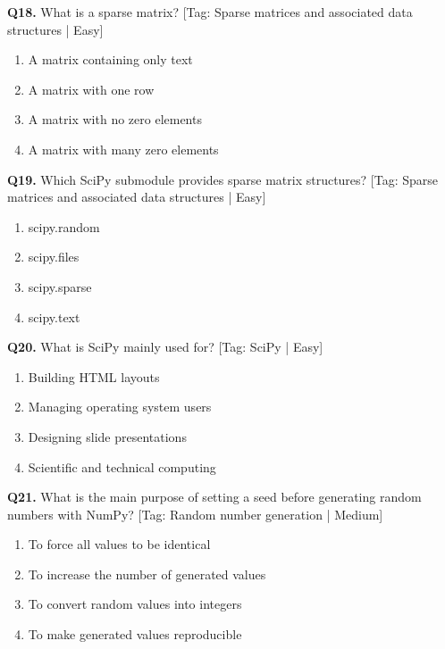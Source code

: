 \vspace{2mm}
\noindent\textbf{Q18.} What is a sparse matrix? \hfill [Tag: Sparse matrices and associated data structures | Easy]
\begin{enumerate}[label=(\alph*),topsep=2pt,itemsep=1pt,partopsep=0pt,parsep=0pt]
    \item {A matrix containing only text}
    \item {A matrix with one row}
    \item {A matrix with no zero elements}
    \item {A matrix with many zero elements}
\end{enumerate}
\vspace{2mm}
\noindent\textbf{Q19.} Which SciPy submodule provides sparse matrix structures? \hfill [Tag: Sparse matrices and associated data structures | Easy]
\begin{enumerate}[label=(\alph*),topsep=2pt,itemsep=1pt,partopsep=0pt,parsep=0pt]
    \item {scipy.random}
    \item {scipy.files}
    \item {scipy.sparse}
    \item {scipy.text}
\end{enumerate}
\vspace{2mm}
\noindent\textbf{Q20.} What is SciPy mainly used for? \hfill [Tag: SciPy | Easy]
\begin{enumerate}[label=(\alph*),topsep=2pt,itemsep=1pt,partopsep=0pt,parsep=0pt]
    \item {Building HTML layouts}
    \item {Managing operating system users}
    \item {Designing slide presentations}
    \item {Scientific and technical computing}
\end{enumerate}
\vspace{2mm}
\noindent\textbf{Q21.} What is the main purpose of setting a seed before generating random numbers with NumPy? \hfill [Tag: Random number generation | Medium]
\begin{enumerate}[label=(\alph*),topsep=2pt,itemsep=1pt,partopsep=0pt,parsep=0pt]
    \item {To force all values to be identical}
    \item {To increase the number of generated values}
    \item {To convert random values into integers}
    \item {To make generated values reproducible}
\end{enumerate}

